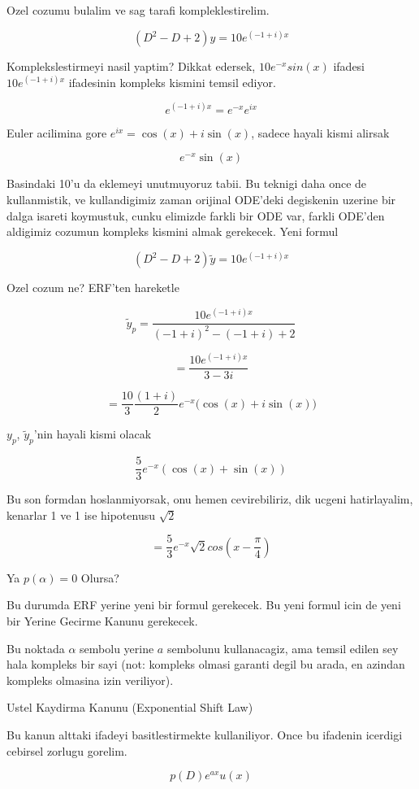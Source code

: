 \documentclass[12pt,fleqn]{article}\usepackage{../common}
\begin{document}
Ozel cozumu bulalim ve sag tarafi kompleklestirelim. 

\[ (D^2 - D + 2)y = 10 e ^{(-1 + i)x} \]

Komplekslestirmeyi nasil yaptim? Dikkat edersek, $10e^{-x}sin(x)$ ifadesi
$10 e^{(-1 + i)x}$ ifadesinin kompleks kismini temsil ediyor. 

\[ e ^{(-1 + i)x} = e^{-x} e^{ix} \]

Euler acilimina gore $e^{ix} = \cos(x) + i\sin(x)$, sadece hayali kismi alirsak

\[ e^{-x} \sin(x)  \]

Basindaki 10'u da eklemeyi unutmuyoruz tabii. Bu teknigi daha once de
kullanmistik, ve kullandigimiz zaman orijinal ODE'deki degiskenin uzerine
bir dalga isareti koymustuk, cunku elimizde farkli bir ODE var, farkli
ODE'den aldigimiz cozumun kompleks kismini almak gerekecek. Yeni formul

\[ (D^2 - D + 2)\tilde{y} = 10 e ^{(-1 + i)x} \]

Ozel cozum ne? ERF'ten hareketle

\[ \tilde{y}_p = \frac{10 e^{(-1+i)x}}{(-1+i)^2 - (-1+i) + 2} \]

\[  = \frac{10 e^{(-1+i)x}}{3 - 3i} \]

\[ = \frac{10}{3}\frac{(1+i)}{2} e^{-x} \bigg( \cos(x) + i\sin(x) \bigg)\]

$y_p$, $\tilde{y}_p$'nin hayali kismi olacak

\[ \frac{5}{3}e^{-x}( \cos(x) + \sin(x)) \]

Bu son formdan hoslanmiyorsak, onu hemen cevirebiliriz, dik ucgeni
hatirlayalim, kenarlar 1 ve 1 ise hipotenusu $\sqrt{2}$

\[ = \frac{5}{3}e^{-x} \sqrt{2}cos(x - \frac{\pi}{4})\]

Ya $p(\alpha) = 0$ Olursa?

Bu durumda ERF yerine yeni bir formul gerekecek. Bu yeni formul icin de
yeni bir Yerine Gecirme Kanunu gerekecek. 

Bu noktada $\alpha$ sembolu yerine $a$ sembolunu kullanacagiz, ama temsil
edilen sey hala kompleks bir sayi (not: kompleks olmasi garanti degil bu
arada, en azindan kompleks olmasina izin veriliyor). 

Ustel Kaydirma Kanunu (Exponential Shift Law)

Bu kanun alttaki ifadeyi basitlestirmekte kullaniliyor. Once bu ifadenin
icerdigi cebirsel zorlugu gorelim.

\[ p(D)e^{ax}u(x) \]
\end{document}
